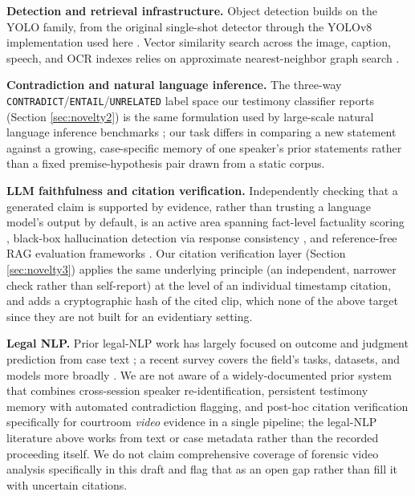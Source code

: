\documentclass[3p,times,procedia]{elsarticle}
\begin{document}
\textbf{Detection and retrieval infrastructure.} Object detection builds on the YOLO
family, from the original single-shot detector \cite{redmon2016} through the YOLOv8
implementation used here \cite{jocher2023}. Vector similarity search across the image,
caption, speech, and OCR indexes relies on approximate nearest-neighbor graph search
\cite{malkov2020hnsw}.

\textbf{Contradiction and natural language inference.} The three-way
\texttt{CONTRADICT}/\texttt{ENTAIL}/\texttt{UNRELATED} label space our testimony
classifier reports (Section \ref{sec:novelty2}) is the same formulation used by
large-scale natural language inference benchmarks \cite{williams2018multinli,
nie2020anli}; our task differs in comparing a new statement against a growing,
case-specific memory of one speaker's prior statements rather than a fixed premise-hypothesis
pair drawn from a static corpus.

\textbf{LLM faithfulness and citation verification.} Independently checking that a
generated claim is supported by evidence, rather than trusting a language model's output
by default, is an active area spanning fact-level factuality scoring
\cite{min2023factscore}, black-box hallucination detection via response consistency
\cite{manakul2023selfcheckgpt}, and reference-free RAG evaluation frameworks
\cite{es2024ragas}. Our citation verification layer (Section \ref{sec:novelty3}) applies
the same underlying principle (an independent, narrower check rather than self-report)
at the level of an individual timestamp citation, and adds a cryptographic hash of the
cited clip, which none of the above target since they are not built for an evidentiary
setting.

\textbf{Legal NLP.} Prior legal-NLP work has largely focused on outcome and judgment
prediction from case text \cite{chalkidis2019legal}; a recent survey covers the field's
tasks, datasets, and models more broadly \cite{ariai2024legalsurvey}. We are not aware of
a widely-documented prior system that combines cross-session speaker re-identification,
persistent testimony memory with automated contradiction flagging, and post-hoc citation
verification specifically for courtroom \emph{video} evidence in a single pipeline; the
legal-NLP literature above works from text or case metadata rather than the recorded
proceeding itself. We do not claim comprehensive coverage of forensic video analysis
specifically in this draft and flag that as an open gap rather than fill it with uncertain
citations.
\end{document}
